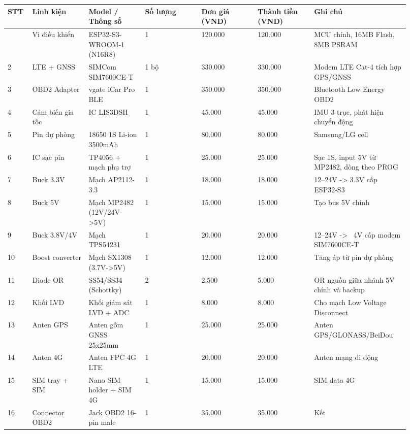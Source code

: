 \documentclass[13pt,a4paper]{extarticle}
\newcounter{none} %
\newcommand{\thesislongtableorignewline}{}
\let\thesislongtableorignewline\\
\renewcommand{\\}{\thesislongtableorignewline\hline}%
\let\\\thesislongtableorignewline
\begin{document}
{\def\LTcaptype{none} %
\begin{longtable}{|p{0.05\linewidth}|p{0.13\linewidth}|p{0.13\linewidth}|p{0.13\linewidth}|p{0.13\linewidth}|p{0.13\linewidth}|p{0.22\linewidth}|}
\hline \textbf{STT} & \textbf{Linh kiện} & \textbf{Model / Thông số} & \textbf{Số lượng} & \textbf{Đơn giá (VND)} & \textbf{Thành
tiền (VND)} & \textbf{Ghi chú} \\
\hline
\endhead
\hline
\endlastfoot
1 & Vi điều khiển & ESP32-S3-WROOM-1 (N16R8) & 1 & 120.000 & 120.000 &
MCU chính, 16MB Flash, 8MB PSRAM \\
2 & LTE + GNSS & SIMCom SIM7600CE-T & 1 bộ & 330.000 & 330.000 & Modem
LTE Cat-4 tích hợp GPS/GNSS \\
3 & OBD2 Adapter & vgate iCar Pro BLE & 1 & 350.000 & 350.000 &
Bluetooth Low Energy OBD2 \\
4 & Cảm biến gia tốc & IC LIS3DSH & 1 & 45.000 & 45.000 & IMU 3 trục,
phát hiện chuyển động \\
5 & Pin dự phòng & 18650 1S Li-ion 3500mAh & 1 & 80.000 & 80.000 &
Samsung/LG cell \\
6 & IC sạc pin & TP4056 + mạch phụ trợ & 1 & 25.000 & 25.000 & Sạc 1S,
input 5V từ MP2482, dòng theo PROG \\
7 & Buck 3.3V & Mạch AP2112-3.3 & 1 & 18.000 & 18.000 & 12--24V
-\textgreater{} 3.3V cấp ESP32-S3 \\
8 & Buck 5V & Mạch MP2482 (12V/24V-\textgreater5V) & 1 & 15.000 & 15.000
& Tạo bus 5V chính \\
9 & Buck 3.8V/4V & Mạch TPS54231 & 1 & 20.000 & 20.000 & 12--24V
-\textgreater{} ~4V cấp modem SIM7600CE-T \\
10 & Boost converter & Mạch SX1308 (3.7V-\textgreater5V) & 1 & 12.000 &
12.000 & Tăng áp từ pin dự phòng \\
11 & Diode OR & SS54/SS34 (Schottky) & 2 & 2.500 & 5.000 & OR nguồn giữa
nhánh 5V chính và backup \\
12 & Khối LVD & Khối giám sát LVD + ADC & 1 & 8.000 & 8.000 & Cho mạch Low Voltage
Disconnect \\
13 & Anten GPS & Anten gốm GNSS 25x25mm & 1 & 25.000 & 25.000 & Anten
GPS/GLONASS/BeiDou \\
14 & Anten 4G & Anten FPC 4G LTE & 1 & 20.000 & 20.000 & Anten mạng di
động \\
15 & SIM tray + SIM & Nano SIM holder + SIM 4G & 1 & 15.000 & 15.000 &
SIM data 4G \\
16 & Connector OBD2 & Jack OBD2 16-pin male & 1 & 35.000 & 35.000 & Kết

\end{longtable}}
\end{document}
